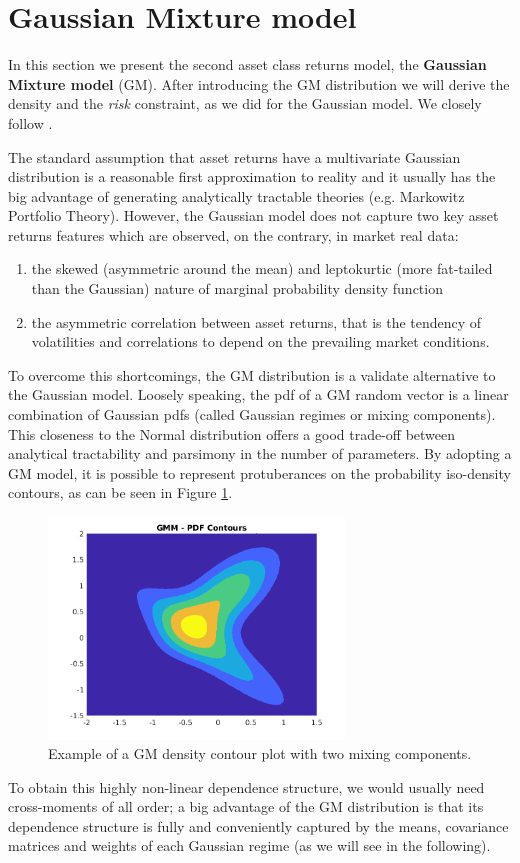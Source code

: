\section{Gaussian Mixture model}
In this section we present the second asset class returns model, the \textbf{Gaussian Mixture model} (GM). After introducing the GM distribution we will derive the density and the \textit{risk} constraint, as we did for the Gaussian model. We closely follow \cite{BUCKLEY2008}.

The standard assumption that asset returns have a multivariate Gaussian distribution is a reasonable first approximation to reality and it usually has the big advantage of generating analytically tractable theories (e.g. Markowitz Portfolio Theory). However, the Gaussian model does not capture two key asset returns features which are observed, on the contrary, in market real data:
\begin{enumerate}
	\item the skewed (asymmetric around the mean) and leptokurtic (more fat-tailed than the Gaussian) nature of marginal probability density function
	\item the asymmetric correlation between asset returns, that is the tendency of volatilities and correlations to depend on the prevailing market conditions.
\end{enumerate}
To overcome this shortcomings, the \gls{GM} distribution is a validate alternative to the Gaussian model. Loosely speaking, the pdf of a GM random vector is a linear combination of Gaussian pdfs (called Gaussian regimes or mixing components). This closeness to the Normal distribution offers a good trade-off between analytical tractability and parsimony in the number of parameters. By adopting a \gls{GM} model, it is possible to represent protuberances on the probability iso-density contours, as can be seen in Figure \ref{fig:countour_GM}.
\begin{figure}[]
	\centering
	\includegraphics[width=0.7\textwidth]{Images/GMdensity.png}
	\caption{Example of a GM density contour plot with two mixing components.}
	\label{fig:countour_GM}
\end{figure}
To obtain this highly non-linear dependence structure, we would usually need cross-moments of all order; a big advantage of the GM distribution is that its dependence structure is fully and conveniently captured by the means, covariance matrices and weights of each Gaussian regime (as we will see in the following).

